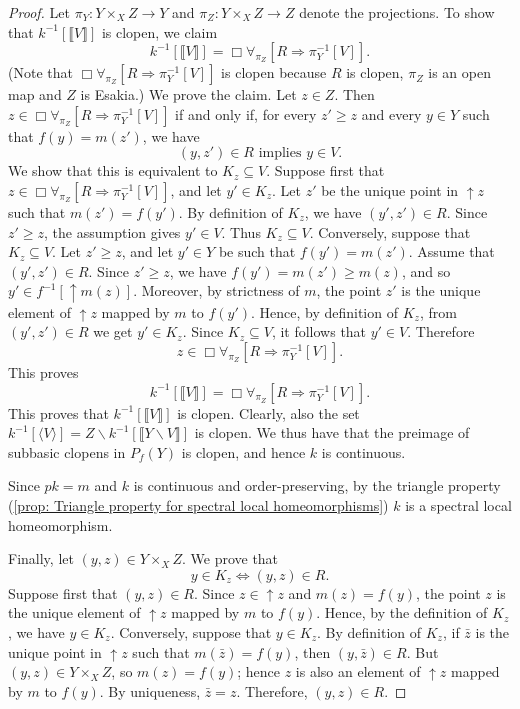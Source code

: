 \documentclass[12pt]{amsart}
\theoremstyle{plain}
\theoremstyle{definition}
\newcommand{\tru}[1]{\llbracket #1 \rrbracket}
\renewcommand{\u}{{\uparrow}}
\begin{document}
\begin{proof}
    Let $\pi_Y \colon Y \times_X Z \to Y$ and $\pi_Z \colon Y \times_X Z \to Z$ denote the projections. To show that $k^{-1}[\llbracket V\rrbracket]$ is clopen, we claim
    \[
        k^{-1}[\llbracket V\rrbracket] = \Box \forall_{\pi_Z}[R \Rightarrow \pi_Y^{-1}[V]].
    \]
    (Note that $\Box \forall_{\pi_Z}[R \Rightarrow \pi_Y^{-1}[V]]$ is clopen because $R$ is clopen, $\pi_{Z}$ is an open map and $Z$ is Esakia.)
    We prove the claim. Let $z\in Z$. Then $z\in \Box \forall_{\pi_Z}[R \Rightarrow \pi_Y^{-1}[V]]$ if and only if, for every $z'\geq z$ and every $y\in Y$ such that $f(y)=m(z')$, we have
    \[
        (y,z')\in R \text{ implies } y\in V.
    \]
    We show that this is equivalent to $K_z\subseteq V$.
    Suppose first that $z\in \Box \forall_{\pi_Z}[R \Rightarrow \pi_Y^{-1}[V]]$, and let $y'\in K_z$. Let $z'$ be the unique point in $\u z$ such that $m(z')=f(y')$. By definition of $K_z$, we have $(y',z')\in R$. Since $z'\geq z$, the assumption gives $y'\in V$. Thus $K_z\subseteq V$.
    Conversely, suppose that $K_z\subseteq V$. Let $z'\geq z$, and let $y'\in Y$ be such that $f(y')=m(z')$. Assume that $(y',z')\in R$. Since $z'\geq z$, we have $f(y')=m(z')\geq m(z)$, and so $y'\in f^{-1}[\u m(z)]$. Moreover, by strictness of $m$, the point $z'$ is the unique element of $\u z$ mapped by $m$ to $f(y')$. Hence, by definition of $K_z$, from $(y',z')\in R$ we get $y'\in K_z$. Since $K_z\subseteq V$, it follows that $y'\in V$. Therefore
    \[
        z\in \Box \forall_{\pi_Z}[R \Rightarrow \pi_Y^{-1}[V]].
    \]
    This proves
    \[
        k^{-1}[\llbracket V\rrbracket]
        =
        \Box \forall_{\pi_Z}[R \Rightarrow \pi_Y^{-1}[V]].
    \]
    This proves that $k^{-1}[\llbracket V \rrbracket]$ is clopen.
    Clearly, also the set $k^{-1}[\langle V \rangle] = Z \smallsetminus k^{-1}[\tru{Y \smallsetminus V}]$ is clopen.
    We thus have that the preimage of subbasic clopens in $P_{f}(Y)$ is clopen, and hence $k$ is continuous. 
    
    Since $pk=m$ and $k$ is continuous and order-preserving, by the triangle property (\cref{prop: Triangle property for spectral local homeomorphisms}) $k$ is a spectral local homeomorphism.    


    Finally, let $(y,z) \in Y\times_X Z$. We prove that
    \[
        y \in K_z \iff (y,z) \in R.
    \]
    Suppose first that $(y,z)\in R$. Since $z\in \u z$ and $m(z)=f(y)$, the point $z$ is the unique element of $\u z$ mapped by $m$ to $f(y)$. Hence, by the definition of $K_z$, we have $y\in K_z$.
    Conversely, suppose that $y\in K_z$. By definition of $K_z$, if $\bar z$ is the unique point in $\u z$ such that $m(\bar z)=f(y)$, then $(y,\bar z)\in R$. But $(y,z)\in Y\times_X Z$, so $m(z)=f(y)$; hence $z$ is also an element of $\u z$ mapped by $m$ to $f(y)$. By uniqueness, $\bar z=z$. Therefore, $(y,z)\in R$.
\end{proof}
\end{document}
